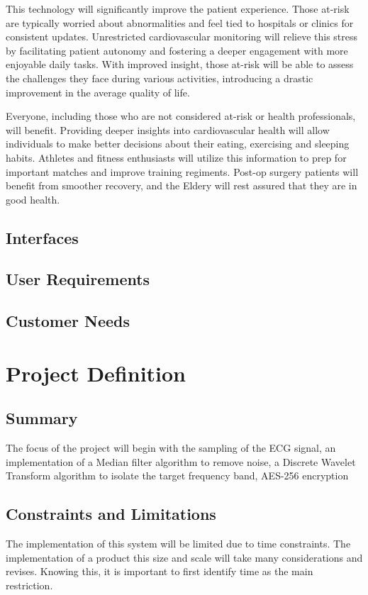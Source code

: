 \documentclass{article}
\begin{document}
This technology will significantly improve the patient experience. Those at-risk are typically worried about abnormalities and feel tied to hospitals or clinics for consistent updates. Unrestricted cardiovascular monitoring will relieve this stress by facilitating patient autonomy and fostering a deeper engagement with more enjoyable daily tasks. With improved insight, those at-risk will be able to assess the challenges they face during various activities, introducing a drastic improvement in the average quality of life. 

Everyone, including those who are not considered at-risk or health professionals, will benefit. Providing deeper insights into cardiovascular health will allow individuals to make better decisions about their eating, exercising and sleeping habits. Athletes and fitness enthusiasts will utilize this information to prep for important matches and improve training regiments. Post-op surgery patients will benefit from smoother recovery, and the Eldery will rest assured that they are in good health.

\subsection{Interfaces}
\subsection{User Requirements}
\subsection{Customer Needs}

\section{Project Definition}

\subsection{Summary}
The focus of the project will begin with the sampling of the ECG signal, an implementation of a Median filter algorithm to remove noise, a Discrete Wavelet Transform algorithm to isolate the target frequency band, AES-256 encryption

\subsection{Constraints and Limitations}
The implementation of this system will be limited due to time constraints. The implementation of a product this size and scale will take many considerations and revises. Knowing this, it is important to first identify time as the main restriction. 
\end{document}
